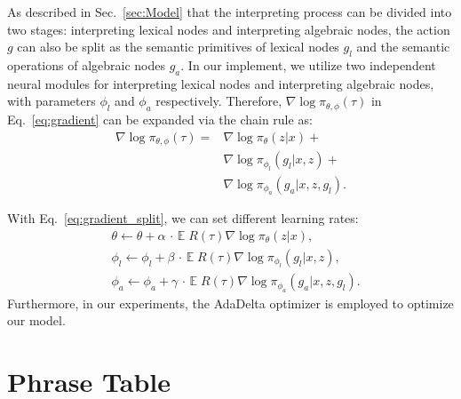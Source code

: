 \documentclass[11pt,a4paper]{article}
\begin{document}
As described in Sec.~\ref{sec:Model} that the interpreting process can be divided into two stages: interpreting lexical nodes and interpreting algebraic nodes, the action $g$ can also be split as the semantic primitives of lexical nodes $g_{l}$ and the semantic operations of algebraic nodes $g_{a}$.
In our implement, we utilize two independent neural modules for interpreting lexical nodes and interpreting algebraic nodes, with parameters $\phi_{l}$ and $\phi_{a}$ respectively.
Therefore, $\nabla \log \pi_{\theta, \phi}\left(\tau\right)$ in Eq.~\ref{eq:gradient} can be expanded via the chain rule as:
\begin{equation}\label{eq:gradient_split}
\begin{split}
    \nabla \log \pi_{\theta, \phi}\left(\tau\right) = 
    &\nabla \log \pi_{\theta}\left(z | x\right) + \\
    &\nabla \log \pi_{\phi_{l}}\left(g_{l} | x, z \right) + \\
    &\nabla \log \pi_{\phi_{a}}\left(g_{a} | x, z, g_{l} \right).
\end{split}
\end{equation}

With Eq.~\ref{eq:gradient_split}, we can set different learning rates:
\begin{equation}
\begin{split}
    &\theta \leftarrow \theta+\alpha\,{\cdot}\,{\mathbb{E}\;R(\tau)\nabla \log \pi_{\theta}\left(z | x \right)}, \\
    &\phi_{l} \leftarrow \phi_{l}+\beta\,{\cdot}\,{\mathbb{E}\;R(\tau)\nabla \log \pi_{\phi_{l}}\left(g_{l} | x, z \right)}, \\
    &\phi_{a} \leftarrow \phi_{a}+\gamma\,{\cdot}\,{\mathbb{E}\;R(\tau)\nabla \log \pi_{\phi_{a}}\left(g_{a} | x, z, g_{l} \right)}.
\end{split}
\end{equation}
Furthermore, in our experiments, the AdaDelta optimizer \cite{adadelta_2012-apd} is employed to optimize our model.

\section{Phrase Table}
\end{document}
